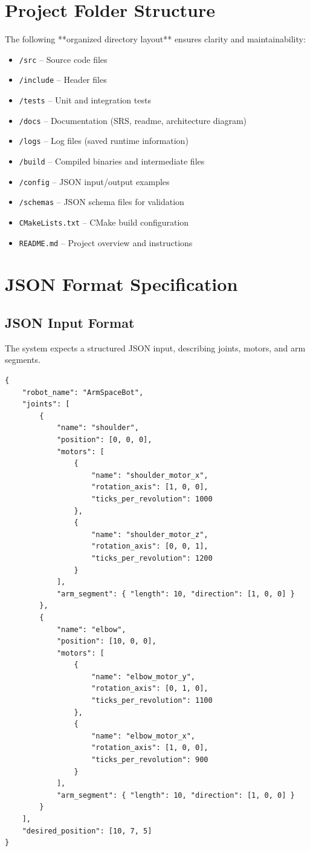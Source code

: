 \documentclass{article}
\begin{document}
\section{Project Folder Structure}
The following **organized directory layout** ensures clarity and maintainability:

\begin{itemize}
    \item \texttt{/src} – Source code files
    \item \texttt{/include} – Header files
    \item \texttt{/tests} – Unit and integration tests
    \item \texttt{/docs} – Documentation (SRS, readme, architecture diagram)
    \item \texttt{/logs} – Log files (saved runtime information)
    \item \texttt{/build} – Compiled binaries and intermediate files
    \item \texttt{/config} – JSON input/output examples
    \item \texttt{/schemas} – JSON schema files for validation
    \item \texttt{CMakeLists.txt} – CMake build configuration
    \item \texttt{README.md} – Project overview and instructions
\end{itemize}

\section{JSON Format Specification}
\subsection{JSON Input Format}
The system expects a structured JSON input, describing joints, motors, and arm segments.

\begin{verbatim}
{
    "robot_name": "ArmSpaceBot",
    "joints": [
        {
            "name": "shoulder",
            "position": [0, 0, 0],
            "motors": [
                {
                    "name": "shoulder_motor_x",
                    "rotation_axis": [1, 0, 0],
                    "ticks_per_revolution": 1000
                },
                {
                    "name": "shoulder_motor_z",
                    "rotation_axis": [0, 0, 1],
                    "ticks_per_revolution": 1200
                }
            ],
            "arm_segment": { "length": 10, "direction": [1, 0, 0] }
        },
        {
            "name": "elbow",
            "position": [10, 0, 0],
            "motors": [
                {
                    "name": "elbow_motor_y",
                    "rotation_axis": [0, 1, 0],
                    "ticks_per_revolution": 1100
                },
                {
                    "name": "elbow_motor_x",
                    "rotation_axis": [1, 0, 0],
                    "ticks_per_revolution": 900
                }
            ],
            "arm_segment": { "length": 10, "direction": [1, 0, 0] }
        }
    ],
    "desired_position": [10, 7, 5]
}
\end{verbatim}
\end{document}
